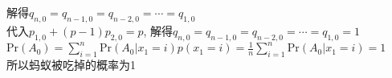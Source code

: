\documentclass{article}
\begin{document}
    解得$q_{n,0} = q_{n-1, 0} = q_{n-2, 0} = \cdots = q_{1,0}$ \\
    代入$p_{1,0} + (p-1)p_{2, 0} = p$, 解得$q_{n,0} = q_{n-1, 0} = q_{n-2, 0} = \cdots = q_{1,0} = 1$\\
    $\mathrm{Pr}(A_0) = \sum_{i=1}^n \mathrm{Pr}(A_0|x_1=i) p(x_1=i)= \frac{1}{n}\sum_{i=1}^n \mathrm{Pr}(A_0|x_1=i) = 1$\\
    所以蚂蚁被吃掉的概率为1
\end{document}
